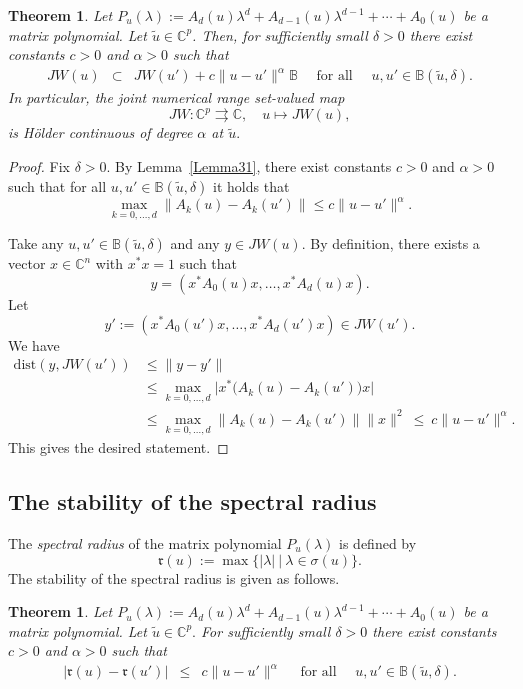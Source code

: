 \documentclass[10pt,reqno]{amsart}
\theoremstyle{break-italic}
\theoremstyle{break-italic}
\theoremstyle{break-italic}
\theoremstyle{break-italic}
\theoremstyle{break-italic}
\theoremstyle{break-italic}
\theoremstyle{break-italic}
\theoremstyle{break-italic}
\newtheorem{theorem}[satz]{Theorem}
\theoremstyle{break-roman}
\theoremstyle{standard}
\theoremstyle{varthm-roman}
\theoremstyle{varthm-italic}
\theoremstyle{varthm-roman-break}
\theoremstyle{varthm-italic-break}
\theoremstyle{varthm-roman-no-punctuation}
\theoremstyle{varthm-italic-no-punctuation}
\numberwithin{equation}{section}
\begin{document}
\begin{theorem}\label{Theorem34}
Let
$P_{u}(\lambda) := A_d(u) \lambda^d  + A_{d - 1}(u) \lambda^{d - 1}  + \cdots + A_{0}(u)$
be a matrix polynomial.  Let $\tilde{u} \in \mathbb{C}^p$. Then, for  sufficiently small $\delta > 0$ there exist constants $c > 0$ and $\alpha > 0$ such that
\begin{eqnarray*}
JW(u) &\subset& JW(u') + c \|u - u'\|^\alpha \mathbb{B} \quad \textrm{ for all } \quad u, u' \in \mathbb{B}(\tilde{u}, \delta).
\end{eqnarray*}
In particular, the joint numerical range set-valued  map
$$JW \colon \mathbb{C}^p \rightrightarrows  \mathbb{C}, \quad u \mapsto JW(u),$$
is H\"older continuous of degree $\alpha$ at $\tilde{u}.$
\end{theorem}

\begin{proof}
Fix $\delta > 0.$ By Lemma~\ref{Lemma31}, there exist constants $c > 0$ and $\alpha > 0$ such that
for all $u, u'\in \mathbb{B}(\tilde{u}, \delta)$ it holds that
$$\max_{k = 0, \ldots, d} \|A_k(u) - A_k(u')\| \le c\|u - u'\|^\alpha.$$

Take any $u, u'\in \mathbb{B}(\tilde{u}, \delta)$ and any $y \in JW(u).$ By definition, there exists a vector $x\in \mathbb C^n$ with $x^*x = 1$ such that
$$y = (x^* A_0(u) x, \ldots, x^*A_{d}(u)x).$$
Let
$$y' := (x^* A_0(u') x, \ldots, x^*A_{d}(u')x) \in JW(u').$$
We have
\begin{align*}
\mathrm{dist}(y, JW(u')) & \leq   \|y-y'\|\\
& \leq \max_{k = 0, \ldots, d} \big|x^*\big(A_k(u) - A_k(u')\big)x\big|\\
& \leq \max_{k = 0, \ldots, d} \|A_k(u) - A_k(u')\| \|x\|^2 \ \le \  c\|u - u'\|^\alpha.
\end{align*}
This gives the desired statement.
\end{proof}




\subsection{The stability of the spectral radius}

The {\em spectral radius}   of the matrix polynomial $P_u(\lambda)$ is defined by
$$\mathfrak{r}(u) := \max \{|\lambda|  \ | \  \lambda \in \sigma (u)\}.$$
The stability of the spectral radius is given as follows.

\begin{theorem}  Let
$P_{u}(\lambda) := A_d(u) \lambda^d  + A_{d - 1}(u) \lambda^{d - 1}  + \cdots + A_{0}(u)$
be a matrix polynomial. 
Let $\tilde{u} \in \mathbb{C}^p.$ For  sufficiently small $\delta > 0$ there exist constants $c > 0$ and $\alpha > 0$ such that
\begin{eqnarray*}
|\mathfrak{r}(u) - \mathfrak{r}(u')| & \le & c \|u - u'\|^\alpha \quad \textrm{ for all } \quad u, u' \in \mathbb{B}(\tilde{u}, \delta).
\end{eqnarray*}
\end{theorem}
\end{document}
